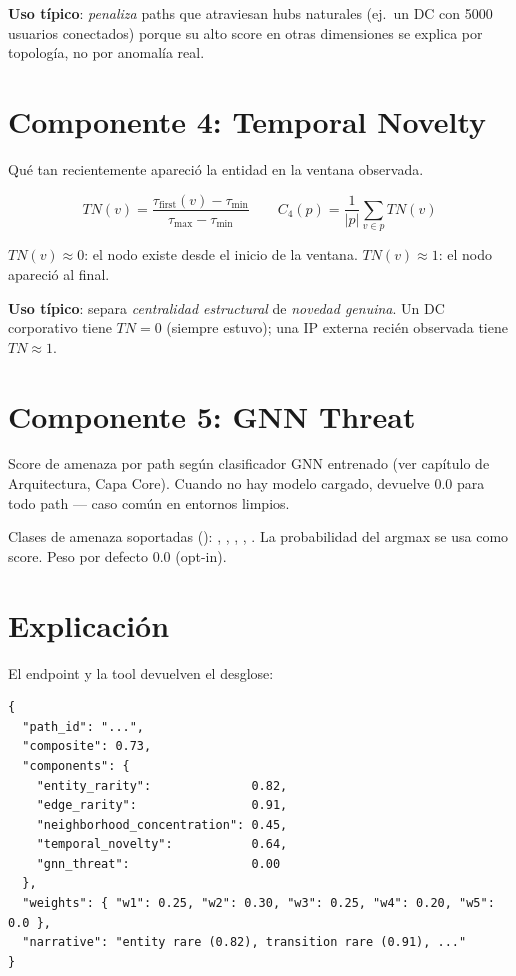 \textbf{Uso típico}: \emph{penaliza} paths que atraviesan hubs
naturales (ej.\ un DC con 5000 usuarios conectados) porque su alto
score en otras dimensiones se explica por topología, no por anomalía
real.

\section{Componente 4: Temporal Novelty}
\label{sec:scoring-tn}

Qué tan recientemente apareció la entidad en la ventana observada.

\begin{equation*}
TN(v) = \frac{\tau_{\text{first}}(v) - \tau_{\min}}{\tau_{\max} - \tau_{\min}}
\qquad C_4(p) = \frac{1}{|p|} \sum_{v \in p} TN(v)
\end{equation*}

$TN(v) \approx 0$: el nodo existe desde el inicio de la ventana.
$TN(v) \approx 1$: el nodo apareció al final.

\textbf{Uso típico}: separa \emph{centralidad estructural} de
\emph{novedad genuina}. Un DC corporativo tiene $TN = 0$ (siempre
estuvo); una IP externa recién observada tiene $TN \approx 1$.

\section{Componente 5: GNN Threat}
\label{sec:scoring-gnn}

Score de amenaza por path según clasificador GNN entrenado
(ver capítulo de Arquitectura, Capa Core). Cuando no hay modelo
cargado, devuelve 0.0 para todo path — caso común en entornos
limpios.

Clases de amenaza soportadas ():
, , ,
, . La probabilidad
del argmax se usa como score. Peso por defecto 0.0 (opt-in).

\section{Explicación}

El endpoint  y la tool
 devuelven el desglose:

\begin{lstlisting}[basicstyle=\ttfamily\small]
{
  "path_id": "...",
  "composite": 0.73,
  "components": {
    "entity_rarity":              0.82,
    "edge_rarity":                0.91,
    "neighborhood_concentration": 0.45,
    "temporal_novelty":           0.64,
    "gnn_threat":                 0.00
  },
  "weights": { "w1": 0.25, "w2": 0.30, "w3": 0.25, "w4": 0.20, "w5": 0.0 },
  "narrative": "entity rare (0.82), transition rare (0.91), ..."
}
\end{lstlisting}

